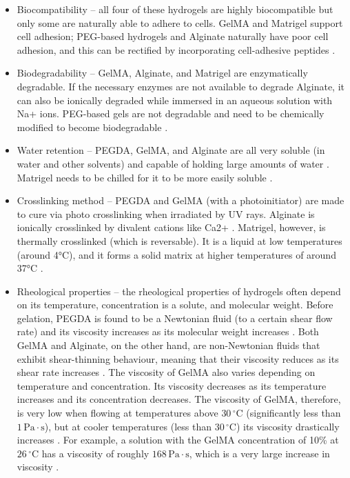 \begin{itemize}
  \item Biocompatibility – all four of these hydrogels are highly biocompatible but only some are naturally able to adhere to cells. GelMA and Matrigel support cell adhesion; PEG-based hydrogels and Alginate naturally have poor cell adhesion, and this can be rectified by incorporating cell-adhesive peptides \citep{liwu2020}.
  \item Biodegradability – GelMA, Alginate, and Matrigel are enzymatically degradable. If the necessary enzymes are not available to degrade Alginate,  it can also be ionically degraded while immersed in an aqueous solution with Na+ ions. PEG-based gels are not degradable and need to be chemically modified to become biodegradable \citep{liwu2020}.
  \item Water retention – PEGDA, GelMA, and Alginate are all very soluble (in water and other solvents) and capable of holding large amounts of water \citep{liwu2020}. Matrigel needs to be chilled for it to be more easily soluble \citep{merceron_2015}.
  \item Crosslinking method – PEGDA and GelMA (with a photoinitiator) are made to cure via photo crosslinking when irradiated by UV rays. Alginate is ionically crosslinked by divalent cations like Ca2+ \citep{liwu2020}. Matrigel, however, is thermally crosslinked (which is reversable). It is a liquid at low temperatures (around 4°C), and it forms a solid matrix at higher temperatures of around 37°C \citep{merceron_2015}.
  \item Rheological properties – the rheological properties of hydrogels often depend on its temperature, concentration is a solute, and molecular weight. Before gelation, PEGDA is found to be a Newtonian fluid (to a certain shear flow rate) and its viscosity increases as its molecular weight increases \citep{brikov_2016}. Both GelMA and Alginate, on the other hand, are non-Newtonian fluids that exhibit shear-thinning behaviour, meaning that their viscosity reduces as its shear rate increases \citep{gregory_2022}. The viscosity of GelMA also varies depending on temperature and concentration. Its viscosity decreases as its temperature increases and its concentration decreases. The viscosity of GelMA, therefore, is very low when flowing at temperatures above \(30\,^{\circ}\mathrm{C}\) (significantly less than \(1\,\mathrm{Pa \cdot s}\)), but at cooler temperatures (less than \(30\,^{\circ}\mathrm{C}\)) its viscosity drastically increases \citep{adhikari2021photoinduced}. For example, a solution with the GelMA concentration of 10\% at \(26\,^{\circ}\mathrm{C}\) has a viscosity of roughly \(168\,\mathrm{Pa \cdot s}\), which is a very large increase in viscosity \citep{cellink_gelma_2020}.

\end{itemize}

